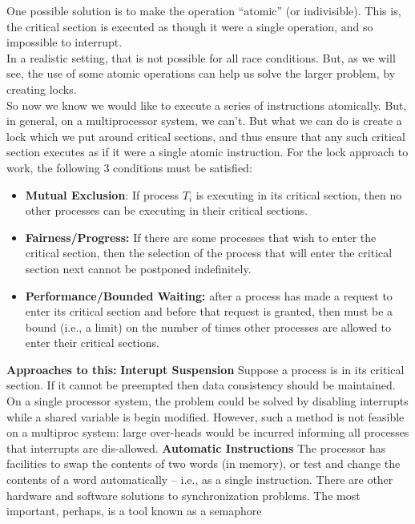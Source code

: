 \documentclass[a4paper, 10pt]{article}
\begin{document}
One possible solution is to make the operation “atomic” (or indivisible). This is, the critical section is executed as though it were a single operation, and so impossible to interrupt. \\[2ex]
In a realistic setting, that is not possible for all race conditions. But, as we will see, the use of some atomic operations can help us solve the larger problem, by creating locks. \\[2ex]
So now we know we would like to execute a series of instructions atomically. But, in general, on a multiprocessor system, we can't. But what we can do is create a lock which we put around critical sections, and thus ensure that any such critical section executes as if it were a single atomic instruction.
For the lock approach to work, the following 3 conditions must be
satisfied:
\begin{itemize}
    \item \textbf{Mutual Exclusion}: If process $T_i$ is executing in its critical section, then no other processes can be executing in their critical sections.
    \item \textbf{Fairness/Progress:} If there are some processes that wish to enter the critical section, then the selection of the process that will enter the critical section next cannot be postponed indefinitely.
    \item \textbf{Performance/Bounded Waiting: }after a process has made a request
          to enter its critical section and before that request is granted, then
          must be a bound (i.e., a limit) on the number of times other
          processes are allowed to enter their critical sections.
\end{itemize}
\textbf{Approaches to this:}
\textbf{Interupt Suspension}
Suppose a process is in its critical section. If it cannot be preempted then data consistency should be maintained. On a single processor system, the problem could be solved by disabling interrupts while a shared variable is begin modified. However, such a method is not feasible on a multiproc system: large over-heads would be incurred informing all processes that interrupts are dis-allowed.
\textbf{Automatic Instructions}
The processor has facilities to swap the contents of two words (in memory), or test and change the contents of a word automatically – i.e., as a single instruction. There are other hardware and software solutions to synchronization problems. The most important, perhaps, is a tool known as a semaphore
\end{document}
